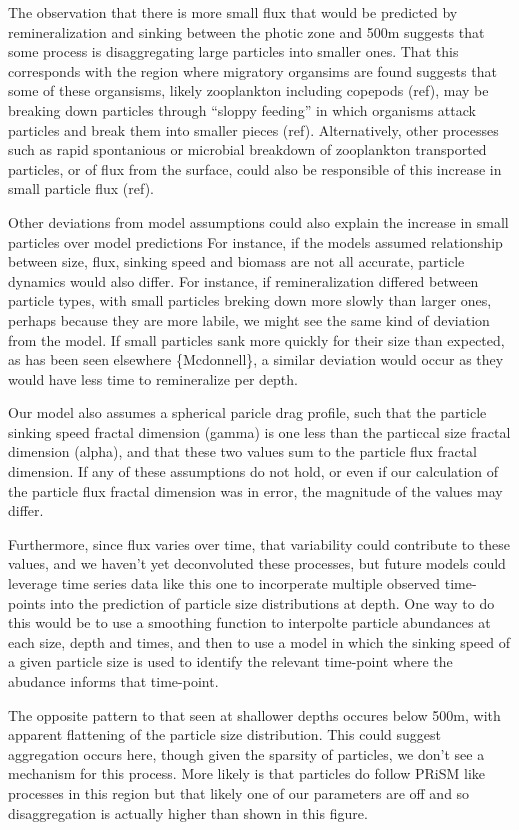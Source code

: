 \documentclass[]{article}
\begin{document}
The observation that there is more small flux that would be predicted by
remineralization and sinking between the photic zone and 500m suggests
that some process is disaggregating large particles into smaller ones.
That this corresponds with the region where migratory organsims are
found suggests that some of these organsisms, likely zooplankton
including copepods (ref), may be breaking down particles through
``sloppy feeding'' in which organisms attack particles and break them
into smaller pieces (ref). Alternatively, other processes such as rapid
spontanious or microbial breakdown of zooplankton transported particles,
or of flux from the surface, could also be responsible of this increase
in small particle flux (ref).

Other deviations from model assumptions could also explain the increase
in small particles over model predictions For instance, if the models
assumed relationship between size, flux, sinking speed and biomass are
not all accurate, particle dynamics would also differ. For instance, if
remineralization differed between particle types, with small particles
breking down more slowly than larger ones, perhaps because they are more
labile, we might see the same kind of deviation from the model. If small
particles sank more quickly for their size than expected, as has been
seen elsewhere \{Mcdonnell\}, a similar deviation would occur as they
would have less time to remineralize per depth.

Our model also assumes a spherical paricle drag profile, such that the
particle sinking speed fractal dimension (gamma) is one less than the
particcal size fractal dimension (alpha), and that these two values sum
to the particle flux fractal dimension. If any of these assumptions do
not hold, or even if our calculation of the particle flux fractal
dimension was in error, the magnitude of the values may differ.

Furthermore, since flux varies over time, that variability could
contribute to these values, and we haven't yet deconvoluted these
processes, but future models could leverage time series data like this
one to incorperate multiple observed time-points into the prediction of
particle size distributions at depth. One way to do this would be to use
a smoothing function to interpolte particle abundances at each size,
depth and times, and then to use a model in which the sinking speed of a
given particle size is used to identify the relevant time-point where
the abudance informs that time-point.

The opposite pattern to that seen at shallower depths occures below
500m, with apparent flattening of the particle size distribution. This
could suggest aggregation occurs here, though given the sparsity of
particles, we don't see a mechanism for this process. More likely is
that particles do follow PRiSM like processes in this region but that
likely one of our parameters are off and so disaggregation is actually
higher than shown in this figure.
\end{document}

